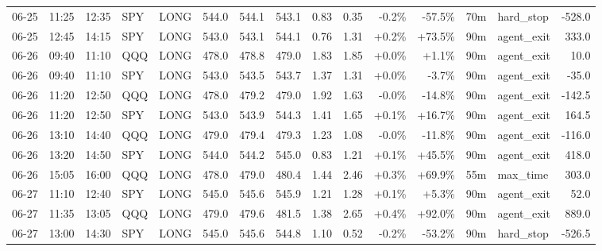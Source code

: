 \documentclass[11pt,a4paper,twoside]{article}
\begin{document}
\begin{landscape}
\begin{center}
\begin{longtable}{>{\color{txtmain}}l l l l l r r r r r r r r >{\color{txtmain}}l r}
06-25 & 11:25 & 12:35 & SPY & LONG & 544.0 & 544.1 & 543.1 & 0.83 & 0.35 & \textcolor{lossred}{-0.2\%} & \textcolor{lossred}{-57.5\%} & 70m & hard\_stop & \textcolor{lossred}{-528.0} \\
06-25 & 12:45 & 14:15 & SPY & LONG & 543.0 & 543.1 & 544.1 & 0.76 & 1.31 & \textcolor{wingreen}{+0.2\%} & \textcolor{wingreen}{+73.5\%} & 90m & agent\_exit & \textcolor{wingreen}{333.0} \\
06-26 & 09:40 & 11:10 & QQQ & LONG & 478.0 & 478.8 & 479.0 & 1.83 & 1.85 & \textcolor{wingreen}{+0.0\%} & \textcolor{wingreen}{+1.1\%} & 90m & agent\_exit & \textcolor{wingreen}{10.0} \\
06-26 & 09:40 & 11:10 & SPY & LONG & 543.0 & 543.5 & 543.7 & 1.37 & 1.31 & \textcolor{wingreen}{+0.0\%} & \textcolor{lossred}{-3.7\%} & 90m & agent\_exit & \textcolor{lossred}{-35.0} \\
06-26 & 11:20 & 12:50 & QQQ & LONG & 478.0 & 479.2 & 479.0 & 1.92 & 1.63 & \textcolor{lossred}{-0.0\%} & \textcolor{lossred}{-14.8\%} & 90m & agent\_exit & \textcolor{lossred}{-142.5} \\
06-26 & 11:20 & 12:50 & SPY & LONG & 543.0 & 543.9 & 544.3 & 1.41 & 1.65 & \textcolor{wingreen}{+0.1\%} & \textcolor{wingreen}{+16.7\%} & 90m & agent\_exit & \textcolor{wingreen}{164.5} \\
06-26 & 13:10 & 14:40 & QQQ & LONG & 479.0 & 479.4 & 479.3 & 1.23 & 1.08 & \textcolor{lossred}{-0.0\%} & \textcolor{lossred}{-11.8\%} & 90m & agent\_exit & \textcolor{lossred}{-116.0} \\
06-26 & 13:20 & 14:50 & SPY & LONG & 544.0 & 544.2 & 545.0 & 0.83 & 1.21 & \textcolor{wingreen}{+0.1\%} & \textcolor{wingreen}{+45.5\%} & 90m & agent\_exit & \textcolor{wingreen}{418.0} \\
06-26 & 15:05 & 16:00 & QQQ & LONG & 478.0 & 479.0 & 480.4 & 1.44 & 2.46 & \textcolor{wingreen}{+0.3\%} & \textcolor{wingreen}{+69.9\%} & 55m & max\_time & \textcolor{wingreen}{303.0} \\
06-27 & 11:10 & 12:40 & SPY & LONG & 545.0 & 545.6 & 545.9 & 1.21 & 1.28 & \textcolor{wingreen}{+0.1\%} & \textcolor{wingreen}{+5.3\%} & 90m & agent\_exit & \textcolor{wingreen}{52.0} \\
06-27 & 11:35 & 13:05 & QQQ & LONG & 479.0 & 479.6 & 481.5 & 1.38 & 2.65 & \textcolor{wingreen}{+0.4\%} & \textcolor{wingreen}{+92.0\%} & 90m & agent\_exit & \textcolor{wingreen}{889.0} \\
06-27 & 13:00 & 14:30 & SPY & LONG & 545.0 & 545.6 & 544.8 & 1.10 & 0.52 & \textcolor{lossred}{-0.2\%} & \textcolor{lossred}{-53.2\%} & 90m & hard\_stop & \textcolor{lossred}{-526.5} \\

\end{longtable}
\end{center}
\end{landscape}
\end{document}
